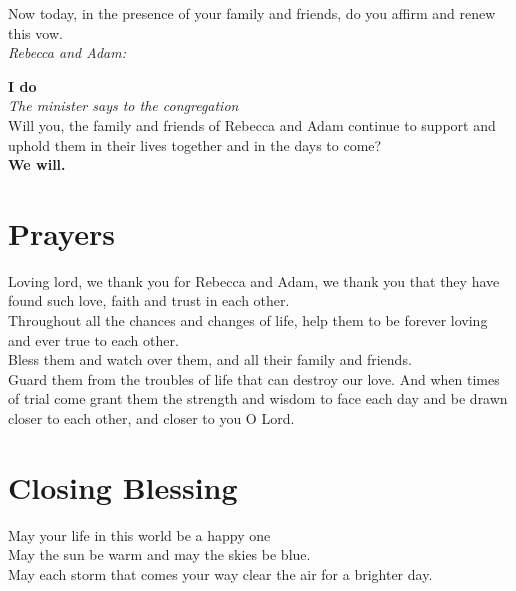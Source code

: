 \documentclass[a5paper,12pt,titlepage]{article}
\begin{document}
Now today, in the presence of your family and friends, do you affirm and renew this vow.\\

{\em Rebecca and Adam:} 

\hspace{2em} {\bf I do}\\

{\em The minister says to the congregation}\\

\hspace{2em} Will you, the family and friends of Rebecca and Adam continue to support and uphold them in their lives together and in the days to come?\\

\hspace{2em} {\bf We will.}

\clearpage

\section{Prayers}

Loving lord, we thank you for Rebecca and Adam, we thank you that they have found such love, faith and trust in each other.\\

Throughout all the chances and changes of life, help them to be forever loving and ever true to each other.\\

Bless them and watch over them, and all their family and friends. \\

Guard them from the troubles of life that can destroy our love. And when times of trial come grant them the strength and wisdom to face each day and be drawn closer to each other, and closer to you O Lord.\\

\section{Closing Blessing}

May your life in this world be a happy one\\

May the sun be warm and may the skies be blue. \\

May each storm that comes your way clear the air for a brighter day. \\ 
\end{document}
